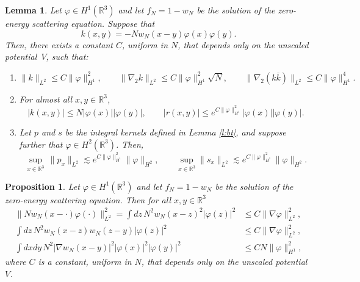 \documentclass[11pt,a4paper,draft,DIV11]{scrartcl}	%
\newtheorem{prp}[thm]{Proposition}
\newtheorem{lem}[thm]{Lemma}
\newcommand{\R}{\mathds{R}}
\newcommand{\norm}[1]{\lVert#1\rVert}	%
\begin{document}
\begin{lem} \label{l:kernels}
  Let $\varphi \in H^1(\R^3)$ and let $f_N=1-w_N$ be the solution of the
  zero-energy scattering equation. Suppose that
  \[
    k(x,y) = - N w_N(x-y) \varphi(x) \varphi(y).
  \]
  Then, there exists a constant $C$, uniform in $N$, that depends only on the
  unscaled potential~$V$, such that: 
  \begin{enumerate}
    \item \label{k}
      \[
        \| k \|_{L^2} \le C \| \varphi \|_{H^1}^2, \qquad \| \nabla_2 k
        \|_{L^2} \le C \| \varphi \|_{H^1}^2 \sqrt{N}, \qquad \| \nabla_2 (k
        \overline{k}) \|_{L^2} \le C \| \varphi \|_{H^1}^4.
      \]
    \item \label{kr} For almost all $x,y \in \R^3$,
      \[
        |k(x,y)| \leq N |\varphi(x)| |\varphi(y)|, \qquad |r(x,y)| \le e^{C \|
        \varphi \|_{H^1}^2} |\varphi(x)| |\varphi(y)|.
      \] 
    \item \label{sup} Let $p$ and $s$ be the integral kernels defined in Lemma
      \ref{l:bt}, and suppose further that $\varphi \in H^2(\R^3)$. Then,
      \[
        \sup_{x \in \R^3} \, \norm{p_x}_{L^2} \apprle e^{C \| \varphi
        \|_{H^1}^2} \norm{\varphi}_{H^2}, \qquad \sup_{x \in \R^3}
        \norm{s_x}_{L^2} \apprle e^{C \| \varphi \|_{H^1}^2}
        \norm{\varphi}_{H^2}.
      \]
  \end{enumerate}
\end{lem}


\begin{prp} \label{p:wphi}
  Let $\varphi \in H^1(\R^3)$ and let $f_N=1-w_N$ be the solution of the
  zero-energy scattering equation. Then for all $x,y \in \R^3$
  \begin{align*}
    \norm{N w_N(x-\cdot)\varphi(\cdot)}_{L^2}^2 = \int dz \, N^2 w_N(x-z)^2 |\varphi(z)|^2 & \le C \| \nabla \varphi
    \|_{L^2}^2, \\
\int dz \, N^2 w_N(x-z) w_N(z-y) |\varphi(z)|^2 & \le C \| \nabla \varphi
    \|_{L^2}^2, \\
    \int dx dy \, N^2 |\nabla w_N(x-y)|^2 |\varphi(x)|^2 |\varphi(y)|^2 & \le
    C N \| \varphi \|_{H^1}^2,
  \end{align*}
  where $C$ is a constant, uniform in $N$, that depends only on the unscaled
  potential $V$.
\end{prp}
\end{document}
